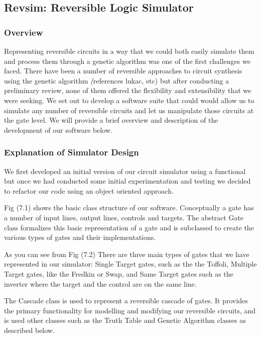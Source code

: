 \subsection{Revsim: Reversible Logic Simulator}
  \subsubsection{Overview}

 Representing reversible circuits in a way that we could both easily simulate them and process them through 
a genetic algorithm was one of the first challenges we faced. There have been a number of reversible approaches 
to circuit synthesis using the genetic algorithm \emph(references lukac, etc) but after conducting a preliminary 
review, none of them offered the flexibility and extensibility that we were seeking. We set out to develop a 
software suite that could would allow us to simulate any number of reversible circuits and let us manipulate those 
circuits at the gate level. We will provide a brief overview and description of the development of our software below.

  \subsubsection{Explanation of Simulator Design}

We first developed an initial version of our circuit simulator using a functional but once we had conducted some initial 
experimentation and testing we decided to refactor our code using an object oriented approach.

Fig (7.1) shows the basic class structure of our software. Conceptually a gate has a number of input lines, output lines, 
controls and targets. The abstract Gate class formalizes this basic representation of a gate and is subclassed to create 
the various types of gates and their implementations.

As you can see from Fig (7.2) There are three main types of gates that we have represented in our simulator: Single Target 
gates, such as the the Toffoli, Multiple Target gates, like the Fredkin or Swap, and Same Target gates such as the inverter 
where the target and the control are on the same line.

The Cascade class is used to represent a reversible cascade of gates. It provides the primary functionality for modelling 
and modifying our reversible circuits, and is used other classes such as the Truth Table and Genetic Algorithm classes as 
described below.

